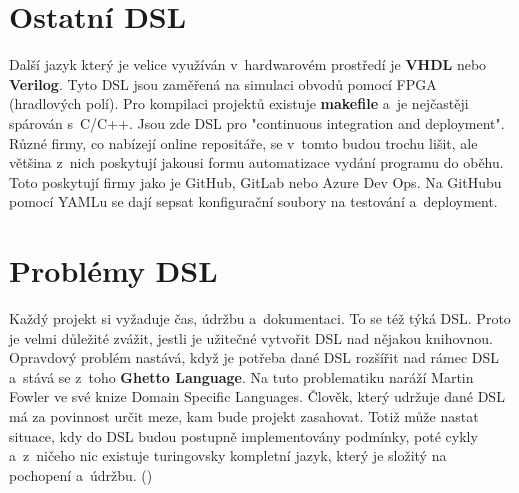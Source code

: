 \documentclass[male, czech]{kithesis}
\begin{document}
\section{Ostatní DSL}
Další jazyk který je velice využíván v~hardwarovém prostředí je \textbf{VHDL} nebo \textbf{Verilog}. 
Tyto DSL jsou zaměřená na simulaci obvodů pomocí FPGA (hradlových polí). 
Pro kompilaci projektů existuje \textbf{makefile} a~je nejčastěji spárován s~C/C++. 
Jsou zde DSL pro "continuous integration and deployment". 
Různé firmy,
co nabízejí online repositáře,
se v~tomto budou trochu lišit, 
ale většina z~nich poskytují jakousi formu automatizace vydání programu do oběhu.
Toto poskytují firmy jako je GitHub,
GitLab nebo Azure Dev Ops. 
Na GitHubu pomocí YAMLu se dají sepsat konfigurační soubory 
na testování a~deployment.

{\begin{center}
\end{center}
}

\section{Problémy DSL}

Každý projekt si vyžaduje čas, údržbu a~dokumentaci.
To se též týká DSL.
Proto je velmi důležité zvážit, 
jestli je užitečné vytvořit DSL nad nějakou knihovnou.
Opravdový problém nastává, 
když je potřeba dané DSL rozšířit nad rámec DSL
a~stává se z~toho \textbf{Ghetto Language}.
Na tuto problematiku naráží Martin Fowler ve své knize Domain Specific Languages.
Člověk,
který udržuje dané DSL má za povinnost určit meze,
kam bude projekt zasahovat. 
Totiž může nastat situace,
kdy do DSL budou postupně implementovány podmínky,
poté cykly
a~z~ničeho nic existuje turingovsky kompletní jazyk, 
který je složitý na pochopení a~údržbu. (\cite[s.38-39]{Fowlerc2011})
\end{document}
